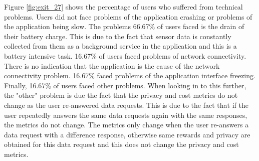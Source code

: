 Figure \ref{fig:exit_27} shows the percentage of users who suffered from technical problems. Users did not face problems of the application crashing or problems of the application being slow. The problems 66.67\% of users faced is the drain of their battery charge. This is due to the fact that sensor data is constantly collected from them as a background service in the application and this is a battery intensive task. 16.67\% of users faced problems of network connectivity. There is no indication that the application is the cause of the network connectivity problem. 16.67\% faced problems of the application interface freezing. Finally, 16.67\% of users faced other problems. When looking in to this further, the "other" problem is due the fact that the privacy and cost metrics do not change as the user re-answered data requests. This is due to the fact that if the user repeatedly answers the same data requests again with the same responses, the metrics do not change. The metrics only change when the user re-answers a data request with a difference response, otherwise same rewards and privacy are obtained for this data request and this does not change the privacy and cost metrics.
